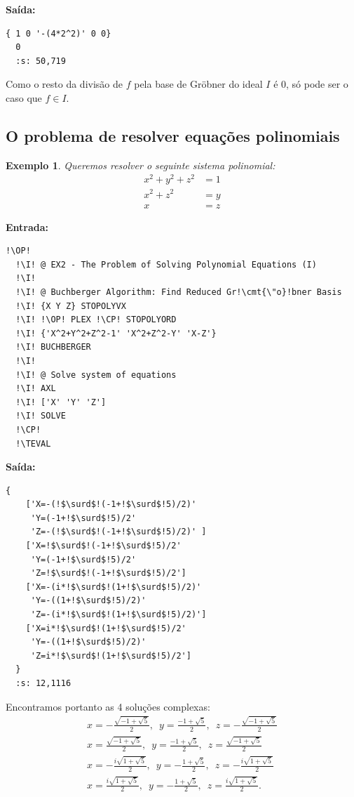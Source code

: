 \documentclass[12pt,a4paper]{report}
\newcommand{\kwd}[1]{\texttt{\textcolor{keyword}{#1}}}
\newcommand{\cmt}[1]{\texttt{\textcolor{comment}{#1}}}
\newcommand{\I}{\enspace\textcolor{indent}\vrule\hspace{2pt}}
\newcommand{\TEVAL}{\kwd{TEVAL}}   %
\newcommand{\OP}{\kwd{$\ll$}}   %
\newcommand{\CP}{\kwd{$\gg$}}   %
\newtheorem{example}[theorem]{Exemplo}
\numberwithin{theorem}{chapter}
\begin{document}
\noindent\textbf{Saída:}

\begin{lstlisting}[language=userrpl]
  { 1 0 '-(4*2^2)' 0 0}
  0
  :s: 50,719
\end{lstlisting}

Como o resto da divisão de \(f\) pela base de Gröbner do ideal \(I\) é
\(0\), só pode ser o caso que \(f \in I\).

\subsection{O problema de resolver equações polinomiais}

\begin{example}
  Queremos resolver o seguinte sistema polinomial:
  \begin{align*}
    x^2+y^2+z^2 &= 1\\
    x^2+z^2 &= y\\
    x &= z
  \end{align*}
\end{example}

\noindent\textbf{Entrada:}

\begin{lstlisting}[language=userrpl]
  !\OP!
  !\I! @ EX2 - The Problem of Solving Polynomial Equations (I)
  !\I!
  !\I! @ Buchberger Algorithm: Find Reduced Gr!\cmt{\"o}!bner Basis
  !\I! {X Y Z} STOPOLYVX
  !\I! !\OP! PLEX !\CP! STOPOLYORD
  !\I! {'X^2+Y^2+Z^2-1' 'X^2+Z^2-Y' 'X-Z'}
  !\I! BUCHBERGER
  !\I!
  !\I! @ Solve system of equations
  !\I! AXL
  !\I! ['X' 'Y' 'Z']
  !\I! SOLVE
  !\CP!
  !\TEVAL
\end{lstlisting}

\noindent\textbf{Saída:}

\begin{lstlisting}[language=userrpl]
  {
    ['X=-(!$\surd$!(-1+!$\surd$!5)/2)'
     'Y=(-1+!$\surd$!5)/2'
     'Z=-(!$\surd$!(-1+!$\surd$!5)/2)' ]
    ['X=!$\surd$!(-1+!$\surd$!5)/2'
     'Y=(-1+!$\surd$!5)/2'
     'Z=!$\surd$!(-1+!$\surd$!5)/2']
    ['X=-(i*!$\surd$!(1+!$\surd$!5)/2)'
     'Y=-((1+!$\surd$!5)/2)'
     'Z=-(i*!$\surd$!(1+!$\surd$!5)/2)']
    ['X=i*!$\surd$!(1+!$\surd$!5)/2'
     'Y=-((1+!$\surd$!5)/2)'
     'Z=i*!$\surd$!(1+!$\surd$!5)/2']
  }
  :s: 12,1116
\end{lstlisting}

Encontramos portanto as 4 soluções complexas:
\begin{align*}
  x=-\frac{\sqrt{-1+\sqrt{5}}}{2},\enspace y=\frac{-1+\sqrt{5}}{2},\enspace z=-\frac{\sqrt{-1+\sqrt{5}}}{2}\\
  x=\frac{\sqrt{-1+\sqrt{5}}}{2},\enspace y=\frac{-1+\sqrt{5}}{2},\enspace z=\frac{\sqrt{-1+\sqrt{5}}}{2}\\
  x=-\frac{i\sqrt{1+\sqrt{5}}}{2},\enspace y=-\frac{1+\sqrt{5}}{2},\enspace z=-\frac{i\sqrt{1+\sqrt{5}}}{2}\\
  x=\frac{i\sqrt{1+\sqrt{5}}}{2},\enspace y=-\frac{1+\sqrt{5}}{2},\enspace z=\frac{i\sqrt{1+\sqrt{5}}}{2}.
\end{align*}
\end{document}
